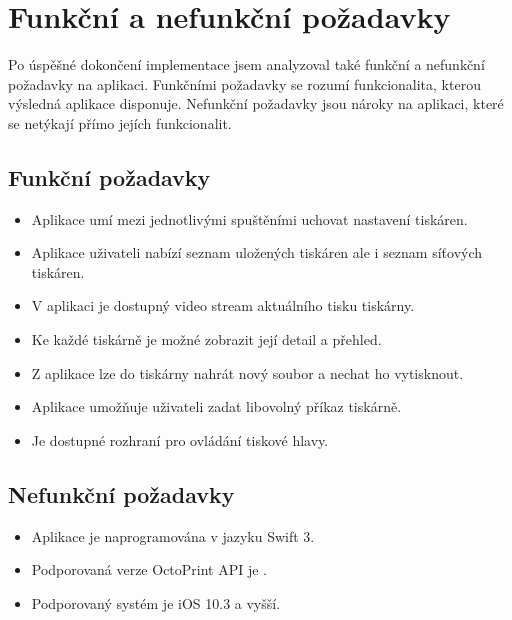 \section{Funkční a nefunkční požadavky}

Po úspěšné dokončení implementace jsem analyzoval také funkční a nefunkční požadavky na aplikaci.
Funkčními požadavky se rozumí funkcionalita, kterou výsledná aplikace disponuje.
Nefunkční požadavky jsou nároky na aplikaci, které se netýkají přímo jejích funkcionalit.

\subsection{Funkční požadavky}

\begin{itemize}
    \item Aplikace umí mezi jednotlivými spuštěními uchovat nastavení tiskáren.
    \item Aplikace uživateli nabízí seznam uložených tiskáren ale i seznam síťových tiskáren.
    \item V aplikaci je dostupný video stream aktuálního tisku tiskárny.
    \item Ke každé tiskárně je možné zobrazit její detail a přehled.
    \item Z aplikace lze do tiskárny nahrát nový soubor a nechat ho vytisknout.
    \item Aplikace umožňuje uživateli zadat libovolný příkaz tiskárně.
    \item Je dostupné rozhraní pro ovládání tiskové hlavy.
\end{itemize}

\subsection{Nefunkční požadavky}

\begin{itemize}
    \item Aplikace je naprogramována v jazyku Swift 3.
    \item Podporovaná verze OctoPrint API je \vapi{}.
    \item Podporovaný systém je iOS 10.3 a vyšší.
\end{itemize}